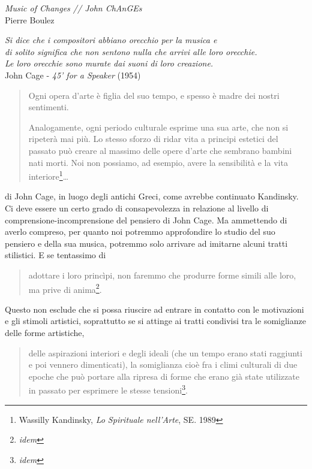 \documentclass[%
			   a4paper,
			   twoside
			   ]{book}
\begin{document}
	\begin{flushright}
		\textit{Music of Changes // John ChAnGEs} \\
		Pierre Boulez
	\end{flushright}

	\begin{flushright}
		\textit{Si dice che i compositori abbiano orecchio per la musica e \\
		di solito significa che non sentono nulla che arrivi alle loro orecchie. \\
		Le loro orecchie sono murate dai suoni di loro creazione.} \\
		John Cage - \emph{45' for a Speaker} (1954)
	\end{flushright}

\bigskip

\begin{multicols}{2}

\begin{quote}
	Ogni opera d'arte è figlia del suo tempo, e spesso è madre dei nostri
	sentimenti.

Analogamente, ogni periodo culturale esprime una sua arte, che non si ripeterà
mai più.
Lo stesso sforzo di ridar vita a principi estetici del passato può creare al
massimo delle opere d'arte che sembrano bambini nati morti.
Noi non possiamo, ad esempio, avere la sensibilità e la vita
interiore\footnote{Wassilly Kandinsky, \emph{Lo Spirituale nell'Arte},
SE. 1989}\ldots
\end{quote}

di John Cage, in luogo degli antichi Greci, come avrebbe continuato Kandinsky.
Ci deve essere un certo grado di consapevolezza in relazione al livello di
comprensione-incomprensione del pensiero di John Cage. Ma ammettendo di
averlo compreso, per quanto noi potremmo approfondire lo studio del suo
pensiero e della sua musica, potremmo solo arrivare ad imitarne alcuni tratti
stilistici. E se tentassimo di

\begin{quote}
adottare i loro princìpi, non faremmo che produrre forme simili alle loro,
ma prive di anima\footnote{\emph{idem}}.
\end{quote}

Questo non esclude che si possa riuscire ad entrare in contatto con le
motivazioni e gli stimoli artistici, soprattutto se si attinge ai tratti
condivisi tra le somiglianze delle forme artistiche,

\begin{quote}
delle aspirazioni interiori e degli ideali (che un tempo erano stati raggiunti
e poi vennero dimenticati), la somiglianza cioè fra i climi culturali di due
epoche che può portare alla ripresa di forme che erano già state utilizzate in
passato per esprimere le stesse tensioni\footnote{\emph{idem}}.
\end{quote}


\end{multicols}
\end{document}
